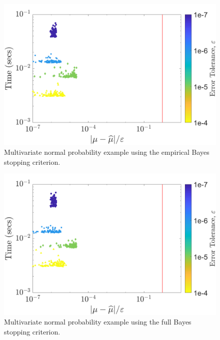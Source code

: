 \documentclass[twocolumn]{svjour3}          %
\begin{document}
\begin{figure}
	\centering
	\includegraphics[width=0.95\linewidth]{"MVN_guaranteed_time_MLE_C2sin_d2_r2_2018-Sep-6"}
	\caption[Guaranteed:]{Multivariate normal probability example using the empirical Bayes stopping criterion.}
	\label{fig:mvn-guaranteed-MLE}
\end{figure}
\begin{figure}
	\centering
	\includegraphics[width=0.95\linewidth]{"MVN_guaranteed_time_full_C2sin_d2_r2_2018-Sep-6"}
	\caption[MVN guaranteed : FB]{Multivariate normal probability example using the full Bayes stopping criterion.}
	\label{fig:mvn-guaranteed-FB}
\end{figure}
\end{document}
